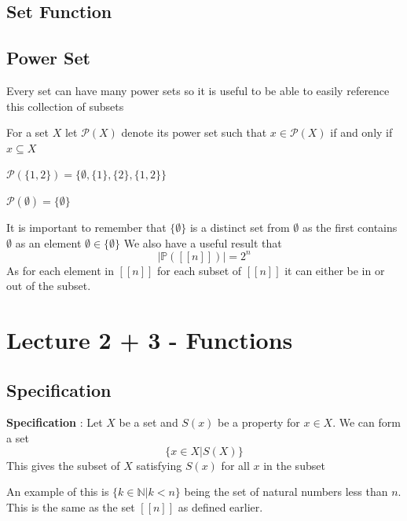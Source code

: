 \documentclass{article}
\begin{document}
\subsection{Set Function}
\subsection{Power Set}
Every set can have many power sets so it is useful to be able to easily reference this collection of subsets
\begin{definition}
    For a set $X$ let $\mathcal{P}(X)$ denote its power set such that $x \in \mathcal{P}(X)$ if and only if $x \subseteq X$
\end{definition}
\begin{example}
    $\mathcal{P}(\{1,2\}) = \{\emptyset,\{1\},\{2\},\{1,2\}\}$
\end{example}
\begin{example}
    $\mathcal{P}(\emptyset) = \{\emptyset\}$
\end{example}
It is important to remember that $\{\emptyset\}$ is a distinct set from $\emptyset$ as the first contains $\emptyset$ as an element $\emptyset \in \{\emptyset\}$ 
We also have a useful result that 
\[|\mathbb{P}([[n]])| = 2^n\]
As for each element in $[[n]]$ for each subset of $[[n]]$ it can either be in or out of the subset.
\section{Lecture 2 + 3 - Functions}
\subsection{Specification}
\begin{definition}
    \textbf{Specification} : Let $X$ be a set and $S(x)$ be a property for $x \in X$. We can form a set \[\{x \in X | S(X)\}\] This gives the subset of $X$ satisfying $S(x)$ for all $x$ in the subset
\end{definition}
An example of this is $\{k \in \mathbb{N} | k < n\}$ being the set of natural numbers less than $n$. This is the same as the set $[[n]]$ as defined earlier.
\end{document}

